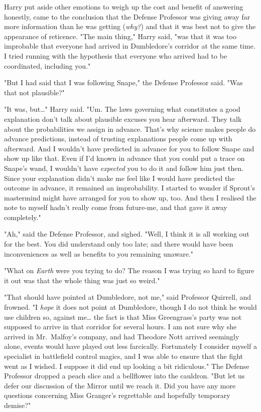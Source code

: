 Harry put aside other emotions to weigh up the cost and benefit of answering 
honestly, came to the conclusion that the Defense Professor was giving away far 
more information than he was getting (\emph{why?}) and that it was best not to 
give the appearance of reticence. "The main thing," Harry said, "was that it 
was too improbable that everyone had arrived in Dumbledore's corridor at the 
same time. I tried running with the hypothesis that everyone who arrived had to 
be coordinated, including you."

"But I had said that I was following Snape," the Defense Professor said. "Was 
that not plausible?"

"It was, but{\ldots}" Harry said. "Um. The laws governing what constitutes a 
good explanation don't talk about plausible excuses you hear afterward. They 
talk about the probabilities we assign in advance. That's why science makes 
people do advance predictions, instead of trusting explanations people come up 
with afterward. And I wouldn't have predicted in advance for you to follow 
Snape and show up like that. Even if I'd known in advance that you could put a 
trace on Snape's wand, I wouldn't have\emph{ expected} you to do it and follow 
him just then. Since your explanation didn't make me feel like I would have 
predicted the outcome in advance, it remained an improbability. I started to 
wonder if Sprout's mastermind might have arranged for you to show up, too. And 
then I realised the note to myself hadn't really come from future-me, and that 
gave it away completely."

"Ah," said the Defense Professor, and sighed. "Well, I think it is all working 
out for the best. You did understand only too late; and there would have been 
inconveniences as well as benefits to you remaining unaware."

"What on \emph{Earth} were you trying to do? The reason I was trying so hard to 
figure it out was that the whole thing was just so weird."

"That should have pointed at Dumbledore, not me," said Professor Quirrell, and 
frowned. "I \emph{hope} it does not point at Dumbledore, though I do not think 
he would use children so, against me{\ldots} the fact is that Miss Greengrass's 
party was not supposed to arrive in that corridor for several hours. I am not 
sure why she arrived in Mr.~Malfoy's company, and had Theodore Nott arrived 
seemingly alone, events would have played out less farcically. Fortunately I 
consider myself a specialist in battlefield control magics, and I was able to 
ensure that the fight went as I wished. I suppose it did end up looking a bit 
ridiculous." The Defense Professor dropped a peach slice and a bellflower into 
the cauldron. "But let us defer our discussion of the Mirror until we reach it. 
Did you have any more questions concerning Miss Granger's regrettable and 
hopefully temporary demise?"

